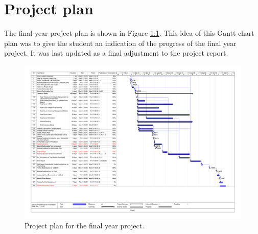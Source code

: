 \chapter{Project plan}
\label{ap:ProjectPlan}
\graphicspath{{Appendix1/Appendix1figures/}}
The final year project plan is shown in Figure \ref{fig:ProjectPlan}. This idea of this Gantt chart plan was to give the student an indication of the progress of the final year project. It was last updated as a final adjustment to the project report.


\begin{figure}
\centering
\includegraphics[scale=0.55, trim=35 54 35 35, clip, angle=90]{SkripsieProjectPlan_Final}
\caption{Project plan for the final year project.}
\label{fig:ProjectPlan}
\end{figure}


